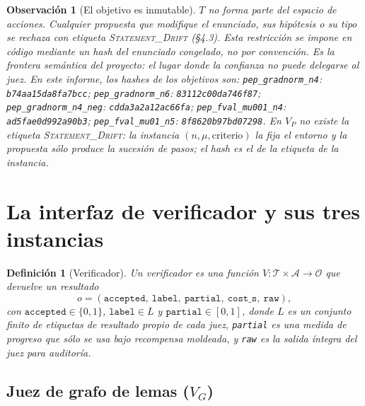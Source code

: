 \documentclass[11pt,a4paper]{article}
\newtheorem{definition}{Definición}
\newtheorem{remark}{Observación}
\begin{document}
\begin{remark}[El objetivo es inmutable]
$T$ no forma parte del espacio de acciones. Cualquier propuesta que modifique el enunciado, sus hipótesis o su tipo se rechaza con etiqueta \textsc{Statement\_Drift} (§4.3). Esta restricción se impone en código mediante un hash del enunciado congelado, no por convención. Es la \emph{frontera semántica} del proyecto: el lugar donde la confianza no puede delegarse al juez.
En este informe, los hashes de los objetivos son: \texttt{pep\_\allowbreak{}gradnorm\_\allowbreak{}n4}: \texttt{b74aa15da8fa7bcc}; \texttt{pep\_\allowbreak{}gradnorm\_\allowbreak{}n6}: \texttt{83112c00da746f87}; \texttt{pep\_\allowbreak{}gradnorm\_\allowbreak{}n4\_\allowbreak{}neg}: \texttt{cdda3a2a12ac66fa}; \texttt{pep\_\allowbreak{}fval\_\allowbreak{}mu001\_\allowbreak{}n4}: \texttt{ad5fae0d992a90b3}; \texttt{pep\_\allowbreak{}fval\_\allowbreak{}mu01\_\allowbreak{}n5}: \texttt{8f8620b97bd07298}. En $V_P$ no existe la etiqueta \textsc{Statement\_Drift}: la instancia $(n, \mu, \text{criterio})$ la fija el entorno y la propuesta sólo produce la sucesión de pasos; el hash es el de la etiqueta de la instancia.
\end{remark}

\section{La interfaz de verificador y sus tres instancias}

\begin{definition}[Verificador]
Un verificador es una función $V : \mathcal{T} \times \mathcal{A} \to \mathcal{O}$ que devuelve un \emph{resultado}
\[
  o = (\texttt{accepted},\ \texttt{label},\ \texttt{partial},\ \texttt{cost\_s},\ \texttt{raw}),
\]
con $\texttt{accepted}\in\{0,1\}$, $\texttt{label}\in L$ y $\texttt{partial}\in[0,1]$,
donde $L$ es un conjunto finito de etiquetas de resultado propio de cada juez, \texttt{partial} es una medida de progreso que sólo se usa bajo recompensa moldeada, y \texttt{raw} es la salida íntegra del juez para auditoría.
\end{definition}

\subsection{Juez de grafo de lemas ($V_G$)}
\end{document}
